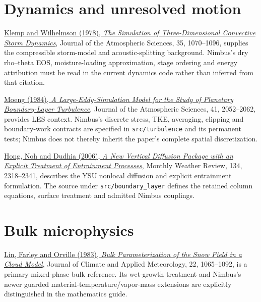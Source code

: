 \documentclass[
  11pt,
]{report}
\begin{document}
\section{Dynamics and unresolved
motion}\label{dynamics-and-unresolved-motion}

\href{https://journals.ametsoc.org/abstract/journals/atsc/35/6/1520-0469_1978_035_1070_tsotdc_2_0_co_2.xml}{Klemp
and Wilhelmson (1978), \emph{The Simulation of Three-Dimensional
Convective Storm Dynamics}}, Journal of the Atmospheric Sciences, 35,
1070--1096, supplies the compressible storm-model and acoustic-splitting
background. Nimbus's dry rho--theta EOS, moisture-loading approximation,
stage ordering and energy attribution must be read in the current
dynamics code rather than inferred from that citation.

\href{https://journals.ametsoc.org/view/journals/atsc/41/13/1520-0469_1984_041_2052_alesmf_2_0_co_2.xml}{Moeng
(1984), \emph{A Large-Eddy-Simulation Model for the Study of Planetary
Boundary-Layer Turbulence}}, Journal of the Atmospheric Sciences, 41,
2052--2062, provides LES context. Nimbus's discrete stress, TKE,
averaging, clipping and boundary-work contracts are specified in
\texttt{src/turbulence} and its permanent tests; Nimbus does not thereby
inherit the paper's complete spatial discretization.

\href{https://journals.ametsoc.org/abstract/journals/mwre/134/9/mwr3199.1.xml}{Hong,
Noh and Dudhia (2006), \emph{A New Vertical Diffusion Package with an
Explicit Treatment of Entrainment Processes}}, Monthly Weather Review,
134, 2318--2341, describes the YSU nonlocal diffusion and explicit
entrainment formulation. The source under \texttt{src/boundary\_layer}
defines the retained column equations, surface treatment and admitted
Nimbus couplings.

\section{Bulk microphysics}\label{bulk-microphysics}

\href{https://www.atmos.albany.edu/facstaff/rfovell/ATM562/lin-etal-1983.pdf}{Lin,
Farley and Orville (1983), \emph{Bulk Parameterization of the Snow Field
in a Cloud Model}}, Journal of Climate and Applied Meteorology, 22,
1065--1092, is a primary mixed-phase bulk reference. Its wet-growth
treatment and Nimbus's newer guarded material-temperature/vapor-mass
extensions are explicitly distinguished in the mathematics guide.
\end{document}
